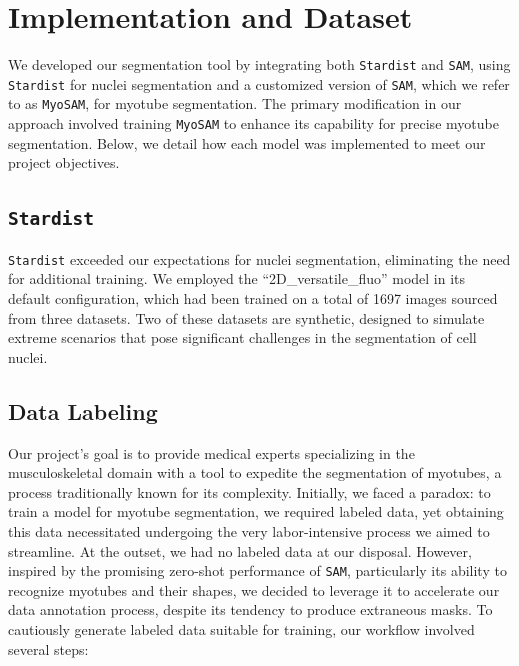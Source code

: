 \section{Implementation and Dataset}\label{secdataset}

We developed our segmentation tool by integrating both \texttt{Stardist} and \texttt{SAM}, using \texttt{Stardist} for nuclei segmentation and a customized version of \texttt{SAM}, which we refer to as \texttt{MyoSAM}, for myotube segmentation. The primary modification in our approach involved training \texttt{MyoSAM} to enhance its capability for precise myotube segmentation. Below, we detail how each model was implemented to meet our project objectives.

\subsection{\texttt{Stardist}}
\texttt{Stardist} exceeded our expectations for nuclei segmentation, eliminating the need for additional training. We employed the ``2D\_versatile\_fluo'' model in its default configuration, which had been trained on a total of 1697 images sourced from three datasets. Two of these datasets are synthetic, designed to simulate extreme scenarios that pose significant challenges in the segmentation of cell nuclei.

\subsection{Data Labeling}

Our project's goal is to provide medical experts specializing in the musculoskeletal domain with a tool to expedite the segmentation of myotubes, a process traditionally known for its complexity. Initially, we faced a paradox: to train a model for myotube segmentation, we required labeled data, yet obtaining this data necessitated undergoing the very labor-intensive process we aimed to streamline. At the outset, we had no labeled data at our disposal. However, inspired by the promising zero-shot performance of \texttt{SAM}, particularly its ability to recognize myotubes and their shapes, we decided to leverage it to accelerate our data annotation process, despite its tendency to produce extraneous masks. To cautiously generate labeled data suitable for training, our workflow involved several steps:


